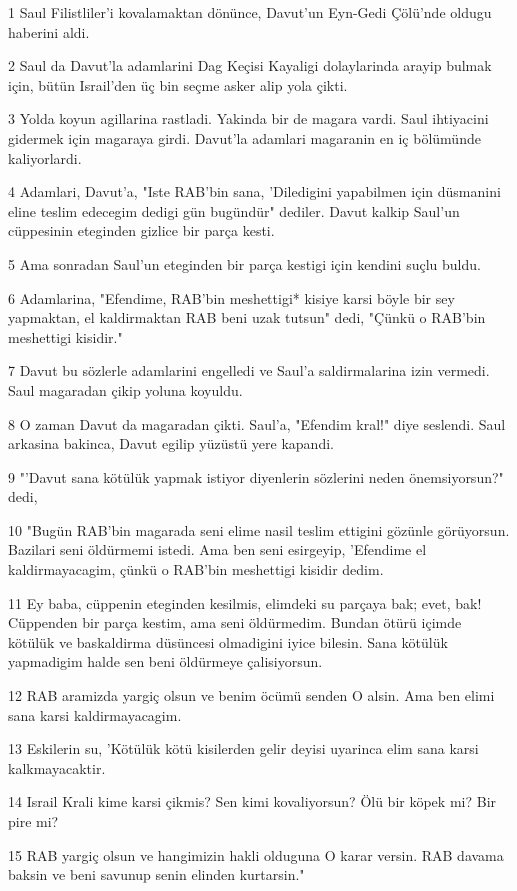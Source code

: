 \par 1 Saul Filistliler'i kovalamaktan dönünce, Davut'un Eyn-Gedi Çölü'nde oldugu haberini aldi.
\par 2 Saul da Davut'la adamlarini Dag Keçisi Kayaligi dolaylarinda arayip bulmak için, bütün Israil'den üç bin seçme asker alip yola çikti.
\par 3 Yolda koyun agillarina rastladi. Yakinda bir de magara vardi. Saul ihtiyacini gidermek için magaraya girdi. Davut'la adamlari magaranin en iç bölümünde kaliyorlardi.
\par 4 Adamlari, Davut'a, "Iste RAB'bin sana, 'Diledigini yapabilmen için düsmanini eline teslim edecegim dedigi gün bugündür" dediler. Davut kalkip Saul'un cüppesinin eteginden gizlice bir parça kesti.
\par 5 Ama sonradan Saul'un eteginden bir parça kestigi için kendini suçlu buldu.
\par 6 Adamlarina, "Efendime, RAB'bin meshettigi* kisiye karsi böyle bir sey yapmaktan, el kaldirmaktan RAB beni uzak tutsun" dedi, "Çünkü o RAB'bin meshettigi kisidir."
\par 7 Davut bu sözlerle adamlarini engelledi ve Saul'a saldirmalarina izin vermedi. Saul magaradan çikip yoluna koyuldu.
\par 8 O zaman Davut da magaradan çikti. Saul'a, "Efendim kral!" diye seslendi. Saul arkasina bakinca, Davut egilip yüzüstü yere kapandi.
\par 9 "'Davut sana kötülük yapmak istiyor diyenlerin sözlerini neden önemsiyorsun?" dedi,
\par 10 "Bugün RAB'bin magarada seni elime nasil teslim ettigini gözünle görüyorsun. Bazilari seni öldürmemi istedi. Ama ben seni esirgeyip, 'Efendime el kaldirmayacagim, çünkü o RAB'bin meshettigi kisidir dedim.
\par 11 Ey baba, cüppenin eteginden kesilmis, elimdeki su parçaya bak; evet, bak! Cüppenden bir parça kestim, ama seni öldürmedim. Bundan ötürü içimde kötülük ve baskaldirma düsüncesi olmadigini iyice bilesin. Sana kötülük yapmadigim halde sen beni öldürmeye çalisiyorsun.
\par 12 RAB aramizda yargiç olsun ve benim öcümü senden O alsin. Ama ben elimi sana karsi kaldirmayacagim.
\par 13 Eskilerin su, 'Kötülük kötü kisilerden gelir deyisi uyarinca elim sana karsi kalkmayacaktir.
\par 14 Israil Krali kime karsi çikmis? Sen kimi kovaliyorsun? Ölü bir köpek mi? Bir pire mi?
\par 15 RAB yargiç olsun ve hangimizin hakli olduguna O karar versin. RAB davama baksin ve beni savunup senin elinden kurtarsin."
